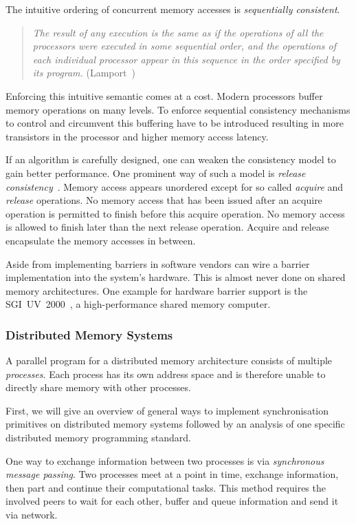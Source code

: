 \documentclass[a4paper, 10pt]{article}
\begin{document}
The intuitive ordering of concurrent memory accesses is \emph{sequentially consistent}.
\begin{quote}
	\textit{The result of any execution is the same as if the operations of all the processors were executed in some sequential order, and the operations of each individual processor appear in this sequence in the order specified by its program.} (Lamport~\cite{sequentialconsistency})
\end{quote}

Enforcing this intuitive semantic comes at a cost. Modern processors buffer memory operations on many levels. To enforce sequential consistency mechanisms to control and circumvent this buffering have to be introduced resulting in more transistors in the processor and higher memory access latency.

If an algorithm is carefully designed, one can weaken the consistency model to gain better performance. One prominent way of such a model is \textit{release consistency}~\cite{gha90}. Memory access appears unordered except for so called \emph{acquire} and \emph{release} operations. No memory access that has been issued after an acquire operation is permitted to finish before this acquire operation. No memory access is allowed to finish later than the next release operation. Acquire and release encapsulate the memory accesses in between.

Aside from implementing barriers in software vendors can wire a barrier implementation into the system's hardware. This is almost never done on shared memory architectures. One example for hardware barrier support is the SGI~UV~2000~\cite{sgiuv2000}, a high-performance shared memory computer.

\subsubsection{Distributed Memory Systems}
\label{sssec:background-means-distributed}
A parallel program for a distributed memory architecture consists of multiple \emph{processes}. Each process has its own address space and is therefore unable to directly share memory with other processes.

First, we will give an overview of general ways to implement synchronisation primitives on distributed memory systems followed by an analysis of one specific distributed memory programming standard.

One way to exchange information between two processes is via \emph{synchronous message passing}. Two processes meet at a point in time, exchange information, then part and continue their computational tasks. This method requires the involved peers to wait for each other, buffer and queue information and send it via network.
\end{document}

